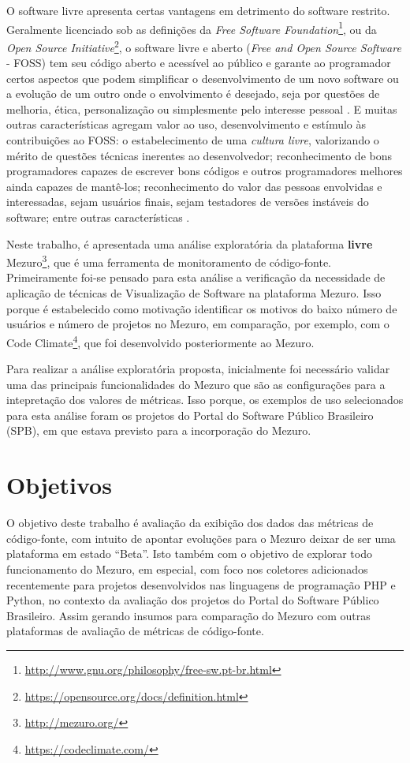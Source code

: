 O software livre apresenta certas vantagens em detrimento do software restrito.
Geralmente licenciado sob as definições da
\textit{Free Software Foundation}\footnote{\url{http://www.gnu.org/philosophy/free-sw.pt-br.html}},
ou da \textit{Open Source Initiative}\footnote{\url{https://opensource.org/docs/definition.html}},
o software livre e aberto (\textit{Free and Open Source Software} - FOSS) tem
seu código aberto e acessível ao público e garante ao programador certos
aspectos que podem simplificar o desenvolvimento de um novo software ou a
evolução de um outro onde o envolvimento é desejado, seja por questões de
melhoria, ética, personalização ou simplesmente pelo interesse pessoal
\cite{meirelles2013monitoramento}. E muitas outras características agregam
valor ao uso, desenvolvimento e estímulo às contribuições ao FOSS: o
estabelecimento de uma \textit{cultura livre}, valorizando o mérito de questões
técnicas inerentes ao desenvolvedor; reconhecimento de bons programadores
capazes de escrever bons códigos e outros programadores melhores ainda capazes de
mantê-los; reconhecimento do valor das pessoas envolvidas e interessadas, sejam
usuários finais, sejam testadores de versões instáveis do software; entre outras
características \cite{raymond1999cathedral}.

Neste trabalho, é apresentada uma análise exploratória da plataforma \textbf{livre}
Mezuro\footnote{\url{http://mezuro.org/}}, que é uma ferramenta de monitoramento
de código-fonte. Primeiramente foi-se pensado para esta análise a verificação da
necessidade de aplicação de técnicas de Visualização de Software na plataforma
Mezuro. Isso porque é estabelecido como motivação identificar os motivos do
baixo número de usuários e número de projetos no Mezuro, em comparação, por
exemplo, com o Code Climate\footnote{\url{https://codeclimate.com/}}, que foi
desenvolvido posteriormente ao Mezuro.

Para realizar a análise exploratória proposta, inicialmente foi necessário
validar uma das principais funcionalidades do Mezuro que são as configurações
para a intepretação dos valores de métricas. Isso porque, os exemplos de uso
selecionados para esta análise foram os projetos do Portal do Software
Público Brasileiro (SPB), em que estava previsto para a incorporação do Mezuro.

\section{Objetivos}

O objetivo deste trabalho é avaliação da exibição dos dados das métricas de
código-fonte, com intuito de apontar evoluções para o Mezuro deixar de ser uma
plataforma em estado ``Beta''.
%
Isto também com o objetivo de explorar todo funcionamento do Mezuro, em especial,
com foco nos coletores adicionados recentemente para projetos desenvolvidos nas
linguagens de programação PHP e Python, no contexto da avaliação dos projetos do
Portal do Software Público Brasileiro.
%
Assim gerando insumos para comparação do Mezuro com outras plataformas de
avaliação de métricas de código-fonte.

